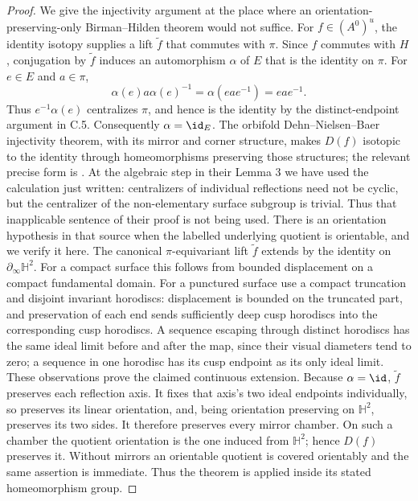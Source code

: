 \begin{proof}
We give the injectivity argument at the place where an
orientation-preserving-only Birman--Hilden theorem would not suffice.
For $f\in(A^0)^u$, the identity isotopy supplies a lift $\widetilde f$
that commutes with $\pi$. Since $f$ commutes with $H$, conjugation by
$\widetilde f$ induces an automorphism $\alpha$ of $E$ that is the
identity on $\pi$. For $e\in E$ and $a\in\pi$,
\[
 \alpha(e)a\alpha(e)^{-1}=\alpha(eae^{-1})=eae^{-1}.
\]
Thus $e^{-1}\alpha(e)$ centralizes $\pi$, and hence is the identity by
the distinct-endpoint argument in C.5. Consequently $\alpha=\id_E$.
The orbifold Dehn--Nielsen--Baer injectivity theorem, with its mirror
and corner structure, makes $D(f)$ isotopic to the identity through
homeomorphisms preserving those structures; the relevant precise form
is \cite[Theorem 2 and Proposition 3]{C_KolbeEvans2021}. At the algebraic
step in their Lemma 3 we have used the calculation just written:
centralizers of individual reflections need not be cyclic, but the
centralizer of the non-elementary surface subgroup is trivial. Thus
that inapplicable sentence of their proof is not being used. There is an orientation hypothesis in that source when the labelled
underlying quotient is orientable, and we verify it here. The canonical
$\pi$-equivariant lift $\widetilde f$ extends by the identity on
$\partial_\infty\mathbb H^2$. For a compact surface this follows from
bounded displacement on a compact fundamental domain. For a punctured
surface use a compact truncation and disjoint invariant horodiscs:
displacement is bounded on the truncated part, and preservation of each
end sends sufficiently deep cusp horodiscs into the corresponding cusp
horodiscs. A sequence escaping through distinct horodiscs has the same
ideal limit before and after the map, since their visual diameters tend
to zero; a sequence in one horodisc has its cusp endpoint as its only
ideal limit. These observations prove the claimed continuous extension.
Because $\alpha=\id$, $\widetilde f$ preserves each reflection axis.
It fixes that axis's two ideal endpoints individually, so preserves its
linear orientation, and, being orientation preserving on $\mathbb H^2$,
preserves its two sides. It therefore preserves every mirror chamber.
On such a chamber the quotient orientation is the one induced from
$\mathbb H^2$; hence $D(f)$ preserves it. Without mirrors an orientable
quotient is covered orientably and the same assertion is immediate.
Thus the theorem is applied inside its stated homeomorphism group.


\end{proof}
